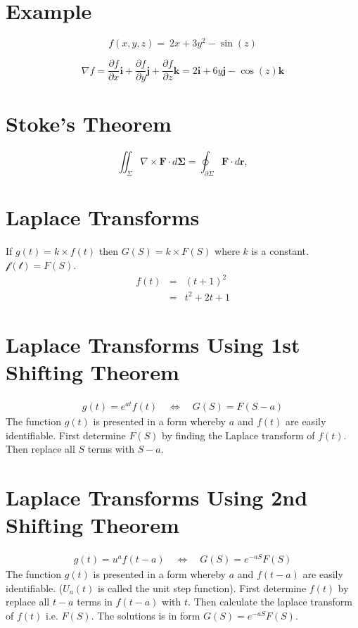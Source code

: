 \documentclass[12pt, a4paper]{article}
\begin{document}
\section{Example}
\[f(x,y,z)= \ 2x+3y^2-\sin(z)\]

\[ \nabla f=
\frac{\partial f}{\partial x} \mathbf{i} +
\frac{\partial f}{\partial y} \mathbf{j} +
\frac{\partial f}{\partial z} \mathbf{k}
 = 2\mathbf{i}+ 6y\mathbf{j} -\cos(z)\mathbf{k}\]

\section{Stoke's Theorem}
\[
\iint_{\Sigma} \nabla \times \mathbf{F} \cdot d\mathbf{\Sigma} = \oint_{\partial\Sigma} \mathbf{F} \cdot d \mathbf{r}, \]

\section{Laplace Transforms }
If $g(t)=k \times f(t)$ then $G(S) = k \times F(S)$ where $k$ is a
constant. $\mathcal{f(t)}=F(S)$.
\begin{eqnarray}
f(t) &=& (t+1)^2\\
&=& t^2 +2t +1 \nonumber
\end{eqnarray}


\section{Laplace Transforms Using 1st Shifting Theorem}
\begin{eqnarray}
 g(t) = e^{at}f(t) \quad \Leftrightarrow \quad G(S)= F(S-a) \nonumber
\end{eqnarray}
The function $g(t)$ is presented in a form whereby $a$ and $f(t)$
are easily identifiable. First determine $F(S)$ by finding the
Laplace transform of $f(t)$. Then replace all $S$ terms with
$S-a$.

\section{Laplace Transforms Using 2nd Shifting Theorem}

\begin{eqnarray}
 g(t) = u^{a}f(t-a) \quad \Leftrightarrow \quad G(S)= e^{-aS}F(S) \nonumber
\end{eqnarray}
The function $g(t)$ is presented in a form whereby $a$ and
$f(t-a)$ are easily identifiable. ($U_{a}(t)$ is called the unit
step function). First determine $f(t)$ by replace all $t-a$ terms
in $f(t-a)$ with $t$. Then calculate the laplace transform of
$f(t)$ i.e. $F(S)$. The solutions is in form $G(S)= e^{-aS}F(S)$.
\end{document}
